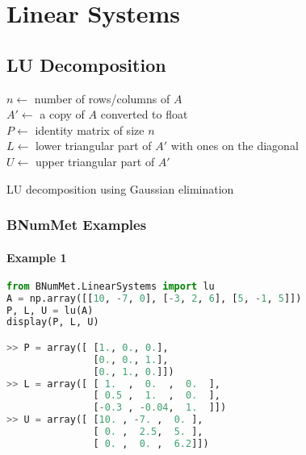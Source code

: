 \section{Linear Systems}
\subsection{LU Decomposition}

\begin{algorithm}[H]
    \SetAlgoLined
    $n \gets$ number of rows/columns of $A$ \\
    $A' \gets$ a copy of $A$ converted to float \\
    $P \gets$ identity matrix of size $n$ \\
    $L \gets$ lower triangular part of $A'$ with ones on the diagonal \\
    $U \gets$ upper triangular part of $A'$ \\
    \caption{LU decomposition using Gaussian elimination}\label{alg:LU decomposition using Gaussian elimination}
\end{algorithm}
\subsubsection{BNumMet Examples}
\paragraph{Example 1}{
\begin{lstlisting}[language=Python]
from BNumMet.LinearSystems import lu
A = np.array([[10, -7, 0], [-3, 2, 6], [5, -1, 5]])
P, L, U = lu(A)
display(P, L, U)

>> P = array([ [1., 0., 0.],
               [0., 0., 1.],
               [0., 1., 0.]])
>> L = array([ [ 1.  ,  0.  ,  0.  ],
               [ 0.5 ,  1.  ,  0.  ],
               [-0.3 , -0.04,  1.  ]])
>> U = array([ [10. , -7. ,  0. ],
               [ 0. ,  2.5,  5. ],
               [ 0. ,  0. ,  6.2]])
           
\end{lstlisting}
}


